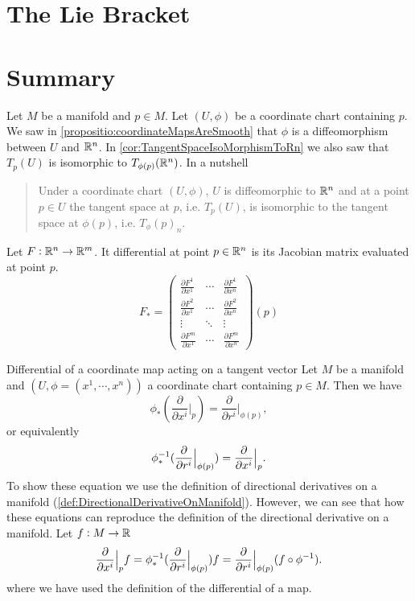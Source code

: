 \section{The Lie Bracket}

\newpage

\section{Summary}
\begin{summary}
	Let $ M $ be a manifold and $ p \in M $. Let $ (U,\phi) $ be a coordinate chart containing $ p $. We saw in \autoref{propositio:coordinateMapsAreSmooth} that $ \phi $ is a diffeomorphism between $ U $ and $ \mathbb{R}^n $. In \autoref{cor:TangentSpaceIsoMorphismToRn} we also saw that $ T_p(U) $ is isomorphic to $ T_{\phi(p)}(\mathbb{R}^n) $. In a nutshell
	\begin{quote}
		Under a coordinate chart $ (U,\phi) $, $ U $ is diffeomorphic to $ \mathbb{R}^n $ and at a point $ p \in U $ the tangent space at $ p $, i.e. $ T_p(U) $, is isomorphic to the tangent space at $ \phi(p) $, i.e. $ T_\phi(p)_n $.
	\end{quote}
\end{summary}

\begin{summary}
	Let $ F: \mathbb{R}^n \to \mathbb{R}^m $. It differential at point $ p \in \mathbb{R}^n $ is its Jacobian matrix evaluated at point $ p $.
	\[ F_* = 
	\begin{pmatrix}
		\frac{\partial F^1}{\partial x^1} & \cdots & \frac{\partial F^1}{\partial x^n} \\
		\frac{\partial F^2}{\partial x^1} & \cdots & \frac{\partial F^2}{\partial x^n} \\
		\vdots & \ddots & \vdots \\
		\frac{\partial F^m}{\partial x^1} & \cdots & \frac{\partial F^m}{\partial x^n}
	\end{pmatrix}(p)
	 \]
\end{summary}

\begin{summary}{Differential of a coordinate map acting on a tangent vector}
	Let $ M $ be a manifold and $ (U,\phi = (x^1,\cdots,x^n)) $ a coordinate chart containing $ p \in M $. Then we have
	\[ \phi_*(\frac{\partial}{\partial  x^i}\big|_{p}) = \frac{\partial}{\partial  r^i}\big|_{\phi(p)} ,\]
	or equivalently
	\[ \phi_*^{-1}(\frac{\partial}{\partial  r^i}\big|_{\phi(p)}) = \frac{\partial}{\partial  x^i}\big|_{p}. \]
	To show these equation we use the definition of directional derivatives on a manifold (\autoref{def:DirectionalDerivativeOnManifold}). However, we can see that how these equations can reproduce the definition of the directional derivative on a manifold. Let $ f:M \to \mathbb{R} $
	\[ \frac{\partial}{\partial  x^i}\big|_{p} f = \phi_*^{-1}(\frac{\partial}{\partial  r^i}\big|_{\phi(p)})f = \frac{\partial}{\partial  r^i}\big|_{\phi(p)}(f\circ\phi^{-1}).  \]
	where we have used the definition of the differential of a map.
\end{summary}

